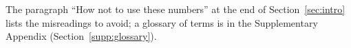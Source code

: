 \begin{center}
{\begin{minipage}{0.94\textwidth}
\begin{enumerate}[leftmargin=*,itemsep=1pt,topsep=2pt]
\end{enumerate}
The paragraph ``How not to use these numbers'' at the end of Section~\ref{sec:intro} lists the misreadings to avoid; a glossary of terms is in the Supplementary Appendix (Section~\ref{supp:glossary}).
\end{minipage}}
\end{center}
